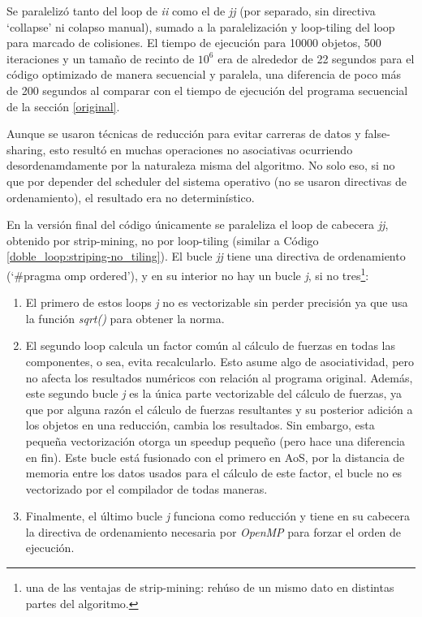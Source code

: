 \documentclass{article}
\begin{document}
Se paralelizó tanto del loop de \textit{ii} como el de \textit{jj} (por separado, sin directiva `collapse' ni colapso manual),
sumado a la paralelización y loop-tiling del loop para marcado de colisiones. El tiempo de ejecución para 10000 objetos, 500 iteraciones y un
tamaño de recinto de $10^6$ era de alrededor de 22 segundos para el código optimizado de manera secuencial y paralela,
una diferencia de poco más de 200 segundos al comparar con el tiempo de ejecución del programa secuencial de la sección \ref{original}.

Aunque se usaron técnicas de reducción para evitar carreras de datos y false-sharing, esto resultó en muchas operaciones
no asociativas ocurriendo desordenamdamente por la naturaleza misma del algoritmo. No solo eso, si no que
por depender del scheduler del sistema operativo (no se usaron directivas de ordenamiento), el resultado era no determinístico.

En la versión final del código únicamente se paraleliza el loop de cabecera \textit{jj}, obtenido
por strip-mining, no por loop-tiling (similar a Código \ref{doble_loop:striping-no_tiling}).
El bucle \textit{jj} tiene una directiva de ordenamiento (`\#pragma omp ordered'), y en su interior
no hay un bucle \textit{j}, si no tres\footnote{una de las ventajas de strip-mining: rehúso de un mismo dato en distintas partes
del algoritmo.}:

\begin{enumerate}
	\item El primero de estos loops \textit{j} no es vectorizable sin perder precisión ya que usa la función \textit{sqrt()} para
obtener la norma.

	\item El segundo loop calcula un factor común al cálculo de fuerzas en todas las componentes, o sea, evita
recalcularlo. Esto asume algo de asociatividad, pero no afecta los resultados numéricos con relación al programa original.
Además, este segundo bucle \textit{j} es la única parte vectorizable del cálculo de fuerzas, ya que por alguna razón el
cálculo de fuerzas resultantes y su posterior adición a los objetos en una reducción, cambia los resultados. Sin embargo,
esta pequeña vectorización otorga un speedup pequeño (pero hace una diferencia en fin). Este bucle está fusionado
con el primero en AoS, por la distancia de memoria entre los datos usados para el cálculo de este factor, el bucle
no es vectorizado por el compilador de todas maneras.

	\item Finalmente, el último bucle \textit{j} funciona como reducción y tiene en su cabecera la directiva de ordenamiento
necesaria por \textit{OpenMP} para forzar el orden de ejecución.
\end{enumerate}
\end{document}
